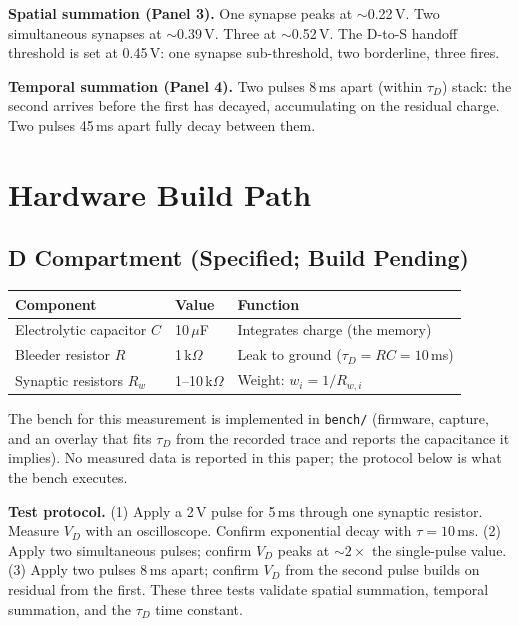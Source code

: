 \documentclass[12pt]{article}
\begin{document}
\textbf{Spatial summation (Panel 3).} One synapse peaks at $\sim$0.22\,V. Two simultaneous synapses at $\sim$0.39\,V. Three at $\sim$0.52\,V. The D-to-S handoff threshold is set at 0.45\,V: one synapse sub-threshold, two borderline, three fires.

\textbf{Temporal summation (Panel 4).} Two pulses 8\,ms apart (within $\tau_D$) stack: the second arrives before the first has decayed, accumulating on the residual charge. Two pulses 45\,ms apart fully decay between them.

\section{Hardware Build Path}
\label{sec:hardware}

\subsection{D Compartment (Specified; Build Pending)}

\begin{center}
\small
\begin{tabular}{lll}
\toprule
\textbf{Component} & \textbf{Value} & \textbf{Function} \\
\midrule
Electrolytic capacitor $C$ & 10\,$\mu$F & Integrates charge (the memory) \\
Bleeder resistor $R$ & 1\,k$\Omega$ & Leak to ground ($\tau_D = RC = 10$\,ms) \\
Synaptic resistors $R_w$ & 1--10\,k$\Omega$ & Weight: $w_i = 1/R_{w,i}$ \\
\bottomrule
\end{tabular}
\end{center}

\noindent The bench for this measurement is implemented in \texttt{bench/} (firmware, capture, and an overlay that fits $\tau_D$ from the recorded trace and reports the capacitance it implies). No measured data is reported in this paper; the protocol below is what the bench executes.

\noindent\textbf{Test protocol.} (1) Apply a 2\,V pulse for 5\,ms through one synaptic resistor. Measure $V_D$ with an oscilloscope. Confirm exponential decay with $\tau = 10$\,ms. (2) Apply two simultaneous pulses; confirm $V_D$ peaks at $\sim 2\times$ the single-pulse value. (3) Apply two pulses 8\,ms apart; confirm $V_D$ from the second pulse builds on residual from the first. These three tests validate spatial summation, temporal summation, and the $\tau_D$ time constant.
\end{document}
